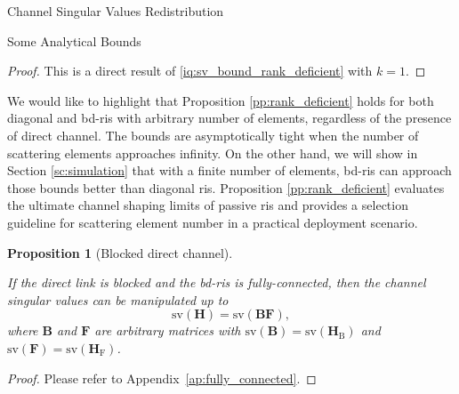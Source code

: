 \documentclass[journal]{IEEEtran}
\newtheorem{proposition}{Proposition}
\begin{document}
\begin{section}{Channel Singular Values Redistribution}
\begin{subsection}{Some Analytical Bounds}
		\begin{proof}
			This is a direct result of \eqref{iq:sv_bound_rank_deficient} with $k = 1$.
		\end{proof}

		We would like to highlight that Proposition \ref{pp:rank_deficient} holds for both diagonal and \gls{bd}-\gls{ris} with arbitrary number of elements, regardless of the presence of direct channel.
		The bounds are asymptotically tight when the number of scattering elements approaches infinity.
		On the other hand, we will show in Section \ref{sc:simulation} that with a finite number of elements, \gls{bd}-\gls{ris} can approach those bounds better than diagonal \gls{ris}.
		Proposition \ref{pp:rank_deficient} evaluates the ultimate channel shaping limits of passive \gls{ris} and provides a selection guideline for scattering element number in a practical deployment scenario.


		\begin{proposition}[Blocked direct channel]\label{pp:fully_connected}

			If the direct link is blocked and the \gls{bd}-\gls{ris} is fully-connected, then the channel singular values can be manipulated up to
			\begin{equation}
				\mathrm{sv}(\mathbf{H}) = \mathrm{sv}(\mathbf{BF}),
			\end{equation}
			where $\mathbf{B}$ and $\mathbf{F}$ are arbitrary matrices with $\mathrm{sv}(\mathbf{B})=\mathrm{sv}(\mathbf{H}_\mathrm{B})$ and $\mathrm{sv}(\mathbf{F})=\mathrm{sv}(\mathbf{H}_\mathrm{F})$.
		\end{proposition}

		\begin{proof}
			Please refer to Appendix~\ref{ap:fully_connected}.
		\end{proof}


\end{subsection}
\end{section}
\end{document}
